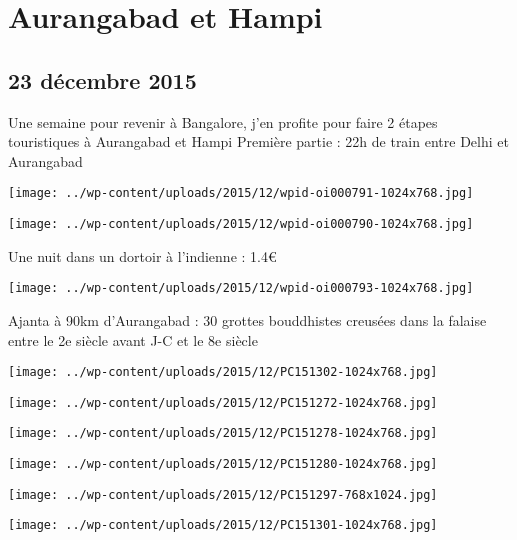 \chapter{Aurangabad et Hampi}
\section*{23 décembre 2015}
Une semaine pour revenir à Bangalore, j'en profite pour faire 2 étapes touristiques à Aurangabad et Hampi \newline
 Première partie : 22h de train entre Delhi et Aurangabad \newline
 \newline
\centerline{\texttt{[image: ../wp-content/uploads/2015/12/wpid-oi000791-1024x768.jpg]} } 
 \newline
 \newline
\centerline{\texttt{[image: ../wp-content/uploads/2015/12/wpid-oi000790-1024x768.jpg]} } 
 \newline
 Une nuit dans un dortoir à l'indienne : 1.4€ \newline
 \newline
\centerline{\texttt{[image: ../wp-content/uploads/2015/12/wpid-oi000793-1024x768.jpg]} } 
 \newline
 Ajanta à 90km d'Aurangabad : 30 grottes bouddhistes creusées dans la falaise entre le 2e siècle avant J-C et le 8e siècle \newline
 \newline
\centerline{\texttt{[image: ../wp-content/uploads/2015/12/PC151302-1024x768.jpg]} } 
 \newline
 \newline
\centerline{\texttt{[image: ../wp-content/uploads/2015/12/PC151272-1024x768.jpg]} } 
 \newline
 \newline
\centerline{\texttt{[image: ../wp-content/uploads/2015/12/PC151278-1024x768.jpg]} } 
 \newline
 \newline
\centerline{\texttt{[image: ../wp-content/uploads/2015/12/PC151280-1024x768.jpg]} } 
 \newline
 \newline
\centerline{\texttt{[image: ../wp-content/uploads/2015/12/PC151297-768x1024.jpg]} } 
 \newline
 \newline
\centerline{\texttt{[image: ../wp-content/uploads/2015/12/PC151301-1024x768.jpg]} } 
